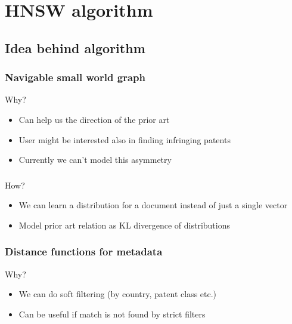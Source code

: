 \documentclass{beamer}
\begin{document}
\section{HNSW algorithm}
\subsection{Idea behind algorithm}
  \begin{frame}
    \frametitle{Navigable small world graph}  
    \Large Why?
   	\begin{itemize}
		\item Can help us the direction of the prior art
		\item User might be interested also in finding infringing patents
		\item Currently we can't model this asymmetry
	\end{itemize}   
  \end{frame}

  \begin{frame}
    \frametitle{}  
    \Large How?
   	\begin{itemize}
		\item We can learn a distribution for a document instead of just a single vector
		\item Model prior art relation as KL divergence of distributions
	\end{itemize}   
  \end{frame}

  \begin{frame}
    \frametitle{Distance functions for metadata}  
    \Large Why?
   	\begin{itemize}
		\item We can do soft filtering (by country, patent class etc.)
		\item Can be useful if match is not found by strict filters
	\end{itemize}   
  \end{frame}
\end{document}

